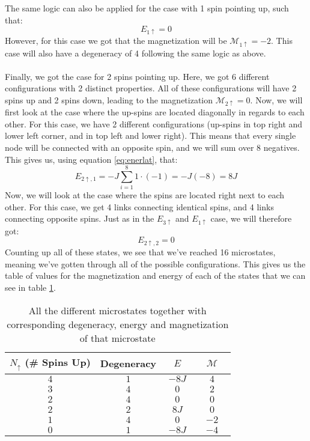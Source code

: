 \documentclass[reprint,english,notitlepage]{revtex4-1}  %
\begin{document}
\begin{appendix}
$$$$
The same logic can also be applied for the case with 1 spin pointing up, such that:
$$
E_{1\uparrow} = 0
$$
However, for this case we got that the magnetization will be $\mathcal{M}_{1\uparrow} = -2$. This case will also have a degeneracy of 4 following the same logic as above.
\\
\\
Finally, we got the case for 2 spins pointing up. Here, we got 6 different configurations with 2 distinct properties. All of these configurations will have 2 spins up and 2 spins down, leading to the magnetization $\mathcal{M}_{2\uparrow} = 0$. Now, we will first look at the case where the up-spins are located diagonally in regards to each other. For this case, we have 2 different configurations (up-spins in top right and lower left corner, and in top left and lower right). This means that every single node will be connected with an opposite spin, and we will sum over 8 negatives. This gives us, using equation \ref{eq:enerlat}, that:
$$
E_{2\uparrow,1} = -J\sum\limits_{i=1}^8 1\cdot(-1) = -J(-8) = 8J
$$
Now, we will look at the case where the spins are located right next to each other. For this case, we get 4 links connecting identical spins, and 4 links connecting opposite spins. Just as in the $E_{3\uparrow}$ and $E_{1\uparrow}$ case, we will therefore got:
$$
E_{2\uparrow,2} = 0
$$
Counting up all of these states, we see that we've reached 16 microstates, meaning we've gotten through all of the possible configurations. This gives us the table of values for the magnetization and energy of each of the states that we can see in table \ref{tab:apptable}.
\begin{table}[h!]
    \centering
    \begin{tabular}{|c|c|c|c|}
        \hline
         $N_{\uparrow}$ (\# Spins Up) & Degeneracy &$\;\;\;E\;\;\;$&$\;\;\;\mathcal{M}\;\;\;$  \\
         \hline\hline
         $4$&$1$&$-8J$&$4$ \\
         $3$&$4$&$0$&$2$\\
         $2$&$4$&$0$&$0$\\
         $2$&$2$&$8J$&$0$\\
         $1$&$4$&$0$&$-2$\\
         $0$&$1$&$-8J$&$-4$\\
         \hline
    \end{tabular}
    \caption{All the different microstates together with corresponding degeneracy, energy and magnetization of that microstate}
    \label{tab:apptable}
\end{table}

\end{appendix}
\end{document}
